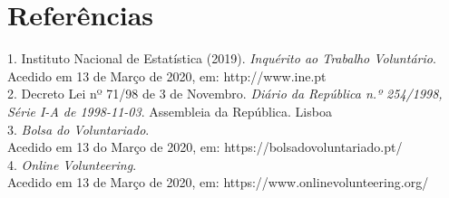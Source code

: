 \section{Referências}
1. Instituto Nacional de Estatística (2019). \textit{Inquérito ao Trabalho Voluntário}. Acedido em 13 de Março de 2020, em: http://www.ine.pt \\
2. Decreto Lei nº 71/98 de 3 de Novembro. \textit{Diário da República n.º 254/1998, Série I-A de 1998-11-03}. Assembleia da República. Lisboa \\
3. \textit{Bolsa do Voluntariado}. \\
Acedido em 13 do Março de 2020, em: https://bolsadovoluntariado.pt/ \\
4. \textit{Online Volunteering}. \\
Acedido em 13 de Março de 2020, em: https://www.onlinevolunteering.org/